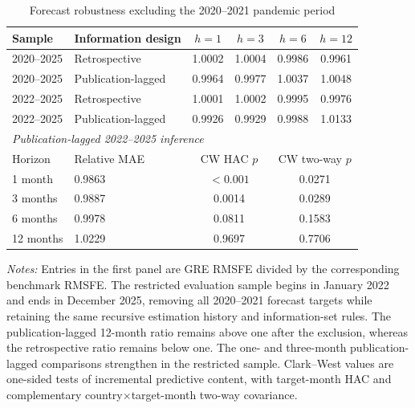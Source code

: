 \begin{table}[htbp]
\centering
\caption{Forecast robustness excluding the 2020--2021 pandemic period}
\label{tab:excovid}
\begin{tabular}{llcccc}
\toprule
Sample & Information design & $h=1$ & $h=3$ & $h=6$ & $h=12$ \\
\midrule
2020--2025 & Retrospective & 1.0002 & 1.0004 & 0.9986 & 0.9961 \\
2020--2025 & Publication-lagged & 0.9964 & 0.9977 & 1.0037 & 1.0048 \\
2022--2025 & Retrospective & 1.0001 & 1.0002 & 0.9995 & 0.9976 \\
2022--2025 & Publication-lagged & 0.9926 & 0.9929 & 0.9988 & 1.0133 \\
\midrule
\multicolumn{6}{l}{\textit{Publication-lagged 2022--2025 inference}} \\
Horizon & Relative MAE & \multicolumn{2}{c}{CW HAC $p$} & \multicolumn{2}{c}{CW two-way $p$} \\
\midrule
1 month & 0.9863 & \multicolumn{2}{c}{$<0.001$} & \multicolumn{2}{c}{0.0271} \\
3 months & 0.9887 & \multicolumn{2}{c}{0.0014} & \multicolumn{2}{c}{0.0289} \\
6 months & 0.9978 & \multicolumn{2}{c}{0.0811} & \multicolumn{2}{c}{0.1583} \\
12 months & 1.0229 & \multicolumn{2}{c}{0.9697} & \multicolumn{2}{c}{0.7706} \\
\bottomrule
\end{tabular}
\begin{minipage}{0.97\textwidth}\footnotesize\textit{Notes:} Entries in the first panel are GRE RMSFE divided by the corresponding benchmark RMSFE. The restricted evaluation sample begins in January 2022 and ends in December 2025, removing all 2020--2021 forecast targets while retaining the same recursive estimation history and information-set rules. The publication-lagged 12-month ratio remains above one after the exclusion, whereas the retrospective ratio remains below one. The one- and three-month publication-lagged comparisons strengthen in the restricted sample. Clark--West values are one-sided tests of incremental predictive content, with target-month HAC and complementary country$\times$target-month two-way covariance.\end{minipage}
\end{table}
